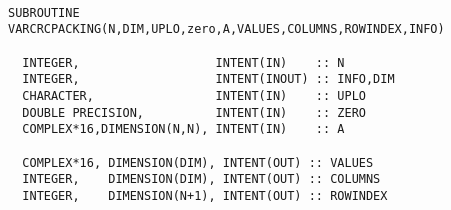 \documentclass[10pt,a4paper]{article}
\begin{document}
\begin{verbatim}

SUBROUTINE VARCRCPACKING(N,DIM,UPLO,zero,A,VALUES,COLUMNS,ROWINDEX,INFO)

  INTEGER,                   INTENT(IN)    :: N
  INTEGER,                   INTENT(INOUT) :: INFO,DIM
  CHARACTER,                 INTENT(IN)    :: UPLO
  DOUBLE PRECISION,          INTENT(IN)    :: ZERO
  COMPLEX*16,DIMENSION(N,N), INTENT(IN)    :: A

  COMPLEX*16, DIMENSION(DIM), INTENT(OUT) :: VALUES
  INTEGER,    DIMENSION(DIM), INTENT(OUT) :: COLUMNS
  INTEGER,    DIMENSION(N+1), INTENT(OUT) :: ROWINDEX

\end{verbatim}


\end{document}
